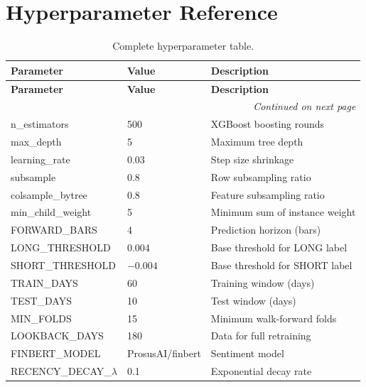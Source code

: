 \documentclass[12pt,a4paper]{article}
\begin{document}
\newpage



\newpage
\appendix
\section{Hyperparameter Reference}
\label{app:hyperparameters}

\begin{longtable}{@{}p{5cm}p{3cm}p{6.5cm}@{}}
\caption{Complete hyperparameter table.} \\
\toprule
\textbf{Parameter} & \textbf{Value} & \textbf{Description} \\
\midrule
\endfirsthead
\toprule
\textbf{Parameter} & \textbf{Value} & \textbf{Description} \\
\midrule
\endhead
\midrule
\multicolumn{3}{r}{\textit{Continued on next page}} \\
\endfoot
\bottomrule
\endlastfoot
n\_estimators & 500 & XGBoost boosting rounds \\
max\_depth & 5 & Maximum tree depth \\
learning\_rate & 0.03 & Step size shrinkage \\
subsample & 0.8 & Row subsampling ratio \\
colsample\_bytree & 0.8 & Feature subsampling ratio \\
min\_child\_weight & 5 & Minimum sum of instance weight \\
FORWARD\_BARS & 4 & Prediction horizon (bars) \\
LONG\_THRESHOLD & 0.004 & Base threshold for LONG label \\
SHORT\_THRESHOLD & $-0.004$ & Base threshold for SHORT label \\
\midrule
TRAIN\_DAYS & 60 & Training window (days) \\
TEST\_DAYS & 10 & Test window (days) \\
MIN\_FOLDS & 15 & Minimum walk-forward folds \\
LOOKBACK\_DAYS & 180 & Data for full retraining \\
\midrule
FINBERT\_MODEL & ProsusAI/finbert & Sentiment model \\
RECENCY\_DECAY\_$\lambda$ & 0.1 & Exponential decay rate \\

\end{longtable}
\end{document}
